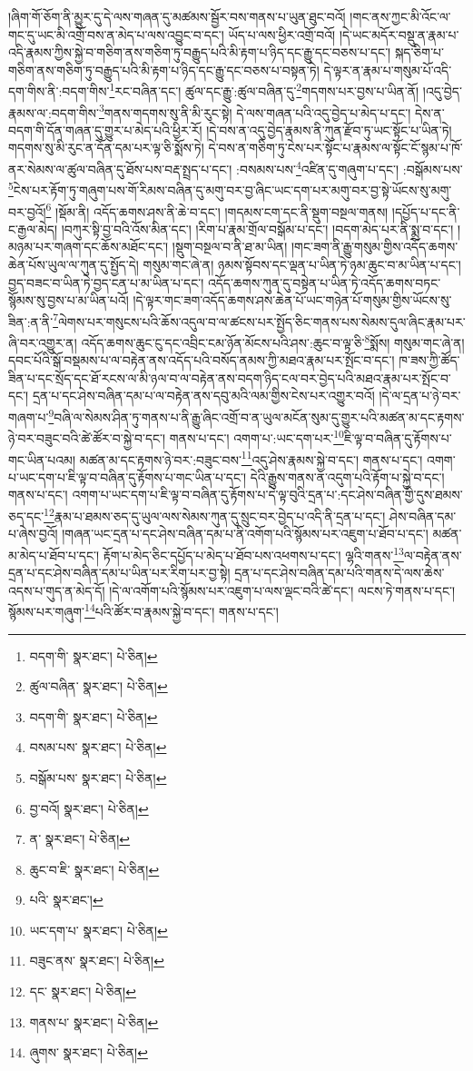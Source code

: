 །ཞིག་གོ་ཅོག་ནི་མྱུར་དུ་དེ་ལས་གཞན་དུ་མཚམས་སྦྱོར་བས་གནས་པ་ཡུན་ཐུང་བའོ། །གང་ནས་ཀྱང་མི་འོང་ལ་གང་དུ་ཡང་མི་འགྲོ་བས་ན་མེད་པ་ལས་འབྱུང་བ་དང་། ཡོད་པ་ལས་ཕྱིར་འགྲོ་བའོ། །དེ་ཡང་མདོར་བསྡུ་ན་རྣམ་པ་འདི་རྣམས་ཀྱིས་སྐྱེ་བ་གཅིག་ནས་གཅིག་ཏུ་བརྒྱུད་པའི་མི་རྟག་པ་ཉིད་དང་རྒྱུ་དང་བཅས་པ་དང་། སྐད་ཅིག་པ་གཅིག་ནས་གཅིག་ཏུ་བརྒྱུད་པའི་མི་རྟག་པ་ཉིད་དང་རྒྱུ་དང་བཅས་པ་བསྟན་ཏེ། དེ་ལྟར་ན་རྣམ་པ་གསུམ་པོ་འདི་དག་གིས་ནི་:བདག་གིས་\footnote{བདག་གི་  སྣར་ཐང་།  པེ་ཅིན། }རང་བཞིན་དང་། ཚུལ་དང་རྒྱུ་:ཚུལ་བཞིན་དུ་\footnote{ཚུལ་བཞིན་  སྣར་ཐང་།  པེ་ཅིན། }གདགས་པར་བྱས་པ་ཡིན་ནོ། །འདུ་བྱེད་རྣམས་ལ་:བདག་གིས་\footnote{བདག་གི་  སྣར་ཐང་།  པེ་ཅིན། }གནས་གདགས་སུ་ནི་མི་རུང་སྟེ། དེ་ལས་གཞན་པའི་འདུ་བྱེད་པ་མེད་པ་དང་། དེས་ན་བདག་གི་དོན་གཞན་དུ་གྱུར་པ་མེད་པའི་ཕྱིར་རོ། །དེ་བས་ན་འདུ་བྱེད་རྣམས་ནི་ཀུན་རྫོབ་ཏུ་ཡང་སྟོང་པ་ཡིན་ཏེ། གདགས་སུ་མི་རུང་ན་དོན་དམ་པར་ལྟ་ཅི་སྨོས་ཏེ། དེ་བས་ན་གཅིག་ཏུ་ངེས་པར་སྟོང་པ་རྣམས་ལ་སྟོང་ངོ་སྙམ་པ་ཁོ་ནར་སེམས་ལ་ཚུལ་བཞིན་དུ་ཐོས་པས་བརྡ་སྤྲད་པ་དང་། :བསམས་པས་\footnote{བསམ་པས་  སྣར་ཐང་།  པེ་ཅིན། }འཛིན་དུ་གཞུག་པ་དང་། :བསྒོམས་པས་\footnote{བསྒོམ་པས་  སྣར་ཐང་།  པེ་ཅིན། }ངེས་པར་རྟོག་ཏུ་གཞུག་པས་གོ་རིམས་བཞིན་དུ་མགུ་བར་བྱ་ཞིང་ཡང་དག་པར་མགུ་བར་བྱ་སྟེ་ཡོངས་སུ་མགུ་བར་བྱའོ།\footnote{བྱ་བའོ།  སྣར་ཐང་།  པེ་ཅིན། } །སྡོམ་ནི། འདོད་ཆགས་ཤས་ནི་ཆེ་བ་དང་། །གདམས་ངག་དང་ནི་སྡུག་བསྔལ་གནས། །དཔྱོད་པ་དང་ནི་ང་རྒྱལ་མེད། །བཀུར་སྟི་བྱ་བའི་འོས་མིན་དང་། །རིག་པ་རྣམ་གྲོལ་བསྒོམ་པ་དང་། །བདག་མེད་པར་ནི་སྨྲ་བ་དང་། །མཉམ་པར་གཞག་དང་ཆོས་མཐོང་དང་། །སྡུག་བསྔལ་བ་ནི་ཐ་མ་ཡིན། །གང་ཟག་ནི་རྒྱུ་གསུམ་གྱིས་འདོད་ཆགས་ཆེན་པོས་ཡུལ་ལ་ཀུན་དུ་སྤྱོད་དེ། གསུམ་གང་ཞེ་ན། ཉམས་སྟོབས་དང་ལྡན་པ་ཡིན་ཏེ་ཉམ་ཆུང་བ་མ་ཡིན་པ་དང་། བྱད་བཟང་བ་ཡིན་ཏེ་བྱད་ངན་པ་མ་ཡིན་པ་དང་། འདོད་ཆགས་ཀུན་དུ་བསྟེན་པ་ཡིན་ཏེ་འདོད་ཆགས་བཏང་སྙོམས་སུ་བྱས་པ་མ་ཡིན་པའོ། །དེ་ལྟར་གང་ཟག་འདོད་ཆགས་ཤས་ཆེན་པོ་ཡང་གཉེན་པོ་གསུམ་གྱིས་ཡོངས་སུ་ཟིན་:ན་ནི་\footnote{ན་  སྣར་ཐང་།  པེ་ཅིན། }ལེགས་པར་གསུངས་པའི་ཆོས་འདུལ་བ་ལ་ཚངས་པར་སྤྱོད་ཅིང་གནས་པས་སེམས་དུལ་ཞིང་རྣམ་པར་ཞི་བར་འགྱུར་ན། འདོད་ཆགས་ཆུང་ངུ་དང་འབྲིང་ངམ་ཉོན་མོངས་པའི་ཤས་:ཆུང་བ་ལྟ་ཅི་\footnote{ཆུང་བ་ཇི་  སྣར་ཐང་།  པེ་ཅིན། }སྨོས། གསུམ་གང་ཞེ་ན། དབང་པོའི་སྒོ་བསྡམས་པ་ལ་བརྟེན་ནས་འདོད་པའི་བསོད་ནམས་ཀྱི་མཐའ་རྣམ་པར་སྤོང་བ་དང་། ཁ་ཟས་ཀྱི་ཚོད་ཟིན་པ་དང་སྲོད་དང་ཐོ་རངས་ལ་མི་ཉལ་བ་ལ་བརྟེན་ནས་བདག་ཉིད་ངལ་བར་བྱེད་པའི་མཐའ་རྣམ་པར་སྤོང་བ་དང་། དྲན་པ་དང་ཤེས་བཞིན་དམ་པ་ལ་བརྟེན་ནས་དབུ་མའི་ལམ་གྱིས་ངེས་པར་འགྱུར་བའོ། །དེ་ལ་དྲན་པ་ཉེ་བར་གཞག་པ་\footnote{པའི་  སྣར་ཐང་། }བཞི་ལ་སེམས་ཤིན་ཏུ་གནས་པ་ནི་རྒྱུ་ཞིང་འགྲོ་བ་ན་ཡུལ་མངོན་སུམ་དུ་གྱུར་པའི་མཚན་མ་དང་རྟགས་ཉེ་བར་བཟུང་བའི་ཚེ་ཚོར་བ་སྐྱེ་བ་དང་། གནས་པ་དང་། འགག་པ་:ཡང་དག་པར་\footnote{ཡང་དག་པ་  སྣར་ཐང་།  པེ་ཅིན། }ཇི་ལྟ་བ་བཞིན་དུ་རྟོགས་པ་གང་ཡིན་པའམ། མཚན་མ་དང་རྟགས་ཉེ་བར་:བཟུང་བས་\footnote{བཟུང་ནས་  སྣར་ཐང་།  པེ་ཅིན། }འདུ་ཤེས་རྣམས་སྐྱེ་བ་དང་། གནས་པ་དང་། འགག་པ་ཡང་དག་པ་ཇི་ལྟ་བ་བཞིན་དུ་རྟོགས་པ་གང་ཡིན་པ་དང་། དེའི་རྒྱུས་གནས་ན་འདུག་པའི་རྟོག་པ་སྐྱེ་བ་དང་། གནས་པ་དང་། འགག་པ་ཡང་དག་པ་ཇི་ལྟ་བ་བཞིན་དུ་རྟོགས་པ་དེ་ལྟ་བུའི་དྲན་པ་:དང་ཤེས་བཞིན་གྱི་དུས་ཐམས་ཅད་དང་\footnote{དང་  སྣར་ཐང་།  པེ་ཅིན། }རྣམ་པ་ཐམས་ཅད་དུ་ཡུལ་ལས་སེམས་ཀུན་དུ་སྲུང་བར་བྱེད་པ་འདི་ནི་དྲན་པ་དང་། ཤེས་བཞིན་དམ་པ་ཞེས་བྱའོ། །གཞན་ཡང་དྲན་པ་དང་ཤེས་བཞིན་དམ་པ་ནི་འགོག་པའི་སྙོམས་པར་འཇུག་པ་ཐོབ་པ་དང་། མཚན་མ་མེད་པ་ཐོབ་པ་དང་། རྟོག་པ་མེད་ཅིང་དཔྱོད་པ་མེད་པ་ཐོབ་པས་འཕགས་པ་དང་། ལྷའི་གནས་\footnote{གནས་པ་  སྣར་ཐང་།  པེ་ཅིན། }ལ་བརྟེན་ནས་དྲན་པ་དང་ཤེས་བཞིན་དམ་པ་ཡིན་པར་རིག་པར་བྱ་སྟེ། དྲན་པ་དང་ཤེས་བཞིན་དམ་པའི་གནས་དེ་ལས་ཆེས་འདས་པ་གུད་ན་མེད་དོ། །དེ་ལ་འགོག་པའི་སྙོམས་པར་འཇུག་པ་ལས་ལྡང་བའི་ཚེ་དང་། ལངས་ཏེ་གནས་པ་དང་། སྙོམས་པར་གཞུག་\footnote{ཞུགས་  སྣར་ཐང་།  པེ་ཅིན། }པའི་ཚོར་བ་རྣམས་སྐྱེ་བ་དང་། གནས་པ་དང་། 